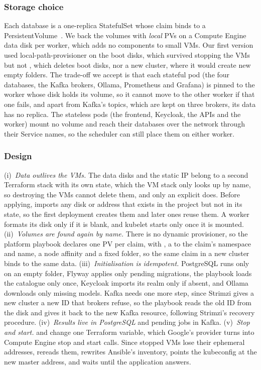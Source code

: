 \subsubsection{Storage choice} Each database is a one-replica StatefulSet whose claim binds to a PersistentVolume~\cite{k8s-pv}. We back the volumes with \emph{local} PVs on a Compute Engine data disk per worker, which adds no components to small VMs. Our first version used local-path-provisioner on the boot disks, which survived stopping the VMs but not , which deletes boot disks, nor a new cluster, where it would create new empty folders. The trade-off we accept is that each stateful pod (the four databases, the Kafka brokers, Ollama, Prometheus and Grafana) is pinned to the worker whose disk holds its volume, so it cannot move to the other worker if that one fails, and apart from Kafka's topics, which are kept on three brokers, its data has no replica. The stateless pods (the frontend, Keycloak, the APIs and the worker) mount no volume and reach their databases over the network through their Service names, so the scheduler can still place them on either worker.

\subsubsection{Design} (i)~\emph{Data outlives the VMs.} The data disks and the static IP belong to a second Terraform stack with its own state, which the VM stack only looks up by name, so destroying the VMs cannot delete them, and only an explicit  does. Before applying,  imports any disk or address that exists in the project but not in its state, so the first deployment creates them and later ones reuse them. A worker formats its disk only if it is blank, and kubelet starts only once it is mounted. (ii)~\emph{Volumes are found again by name.} There is no dynamic provisioner, so the platform playbook declares one PV per claim, with , a  to the claim's namespace and name, a node affinity and a fixed folder, so the same claim in a new cluster binds to the same data. (iii)~\emph{Initialisation is idempotent.} PostgreSQL runs  only on an empty folder, Flyway applies only pending migrations, the playbook loads the catalogue only once, Keycloak imports its realm only if absent, and Ollama downloads only missing models. Kafka needs one more step, since Strimzi gives a new cluster a new ID that brokers refuse, so the playbook reads the old ID from the disk and gives it back to the new Kafka resource, following Strimzi's recovery procedure. (iv)~\emph{Results live in PostgreSQL} and pending jobs in Kafka. (v)~\emph{Stop and start.}  and  change one Terraform variable, which Google's provider turns into Compute Engine stop and start calls. Since stopped VMs lose their ephemeral addresses,  rereads them, rewrites Ansible's inventory, points the kubeconfig at the new master address, and waits until the application answers.

